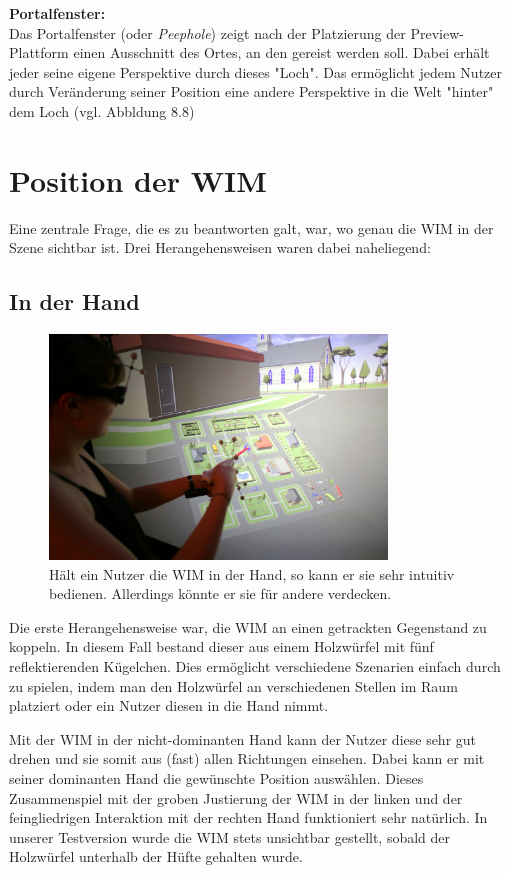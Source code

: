 \textbf{Portalfenster:}\\
Das Portalfenster (oder \textit{Peephole}) zeigt nach der Platzierung der Preview-Plattform einen Ausschnitt des Ortes, an den gereist werden soll. Dabei erhält jeder seine eigene Perspektive durch dieses "Loch". Das ermöglicht jedem Nutzer durch Veränderung seiner Position eine andere Perspektive in die Welt "hinter" dem Loch (vgl. Abbldung 8.8)

\section{Position der WIM}
Eine zentrale Frage, die es zu beantworten galt, war, wo genau die WIM in der Szene sichtbar ist. Drei Herangehensweisen waren dabei naheliegend:

\subsection{In der Hand}

\begin{figure}[h!]
  \centering
  \includegraphics[width=0.8\textwidth]{images/wim_in_hand.JPG}
  \caption{Hält ein Nutzer die WIM in der Hand, so kann er sie sehr intuitiv bedienen. Allerdings könnte er sie für andere verdecken.}
  \label{fig:todo}
\end{figure}

Die erste Herangehensweise war, die WIM an einen getrackten Gegenstand zu koppeln. In diesem Fall bestand dieser aus einem Holzwürfel mit fünf reflektierenden Kügelchen.
Dies ermöglicht verschiedene Szenarien einfach durch zu spielen, indem man den Holzwürfel an verschiedenen Stellen im Raum platziert oder ein Nutzer diesen in die Hand nimmt.

Mit der WIM in der nicht-dominanten Hand kann der Nutzer diese sehr gut drehen und sie somit aus (fast) allen Richtungen einsehen. Dabei kann er mit seiner dominanten Hand die gewünschte Position auswählen. Dieses Zusammenspiel mit der groben Justierung der WIM in der linken und der feingliedrigen Interaktion mit der rechten Hand funktioniert sehr natürlich.
In unserer Testversion wurde die WIM stets unsichtbar gestellt, sobald der Holzwürfel unterhalb der Hüfte gehalten wurde.

